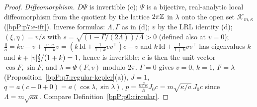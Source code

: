 \begin{proof}
\emph{Diffeomorphism.} $D\Psi$ is invertible (c); $\Psi$ is a bijective, real-analytic local diffeomorphism from the quotient by the lattice $2\pi\mathbb{Z}$ in $\lambda$ onto the open set $\mathcal K_{m,\kappa}$ (\ref{bpP:p7:e-ift}). Inverse formulas: $\Lambda,\Gamma$ as in (d); $v$ by the LRL identity (d); $(\xi,\eta)=v/s$ with $s=\sqrt{(1-\Gamma/(2\Lambda))/\Lambda}>0$ (defined also at $v=0$); $\frac qa=kc-v+\frac{v\cdot c}{1+k}v=(k\,\mathrm{Id}+\frac1{1+k}vv^{\top})c-v$ and $k\,\mathrm{Id}+\frac1{1+k}vv^{\top}$ has eigenvalues $k$ and $k+\lvert v\rvert_2^2/(1+k)=1$, hence is invertible; $c$ is then the unit vector $\cos F,\sin F$, and $\lambda=\Phi(F,v)$ modulo $2\pi$.
\label{stepP:p7:po-circ} $\Gamma=0$ gives $v=0$, $k=1$, $F=\lambda$ (Proposition~\ref{bpP:p7:regular-kepler}(a)), $J=1$, $q=a(c-0+0)=a(\cos\lambda,\sin\lambda)$, $p=\frac{m^2\kappa}\Lambda J_0c=m\sqrt{\kappa/a}\,J_0c$ since $\Lambda=m\sqrt{\kappa a}$. Compare Definition~\ref{bpP:p0:circular}.
\end{proof}


